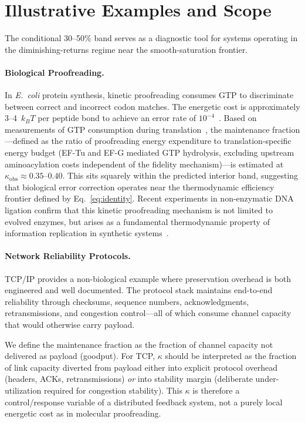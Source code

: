\documentclass[11pt,twocolumn]{article}
\begin{document}
\section{Illustrative Examples and Scope}
\label{sec:validation}

The conditional 30--50\% band serves as a diagnostic tool for systems operating in the diminishing-returns regime near the smooth-saturation frontier.

\paragraph{Biological Proofreading.} In \textit{E.~coli} protein synthesis, kinetic proofreading consumes GTP to discriminate between correct and incorrect codon matches. The energetic cost is approximately 3--4~$k_B T$ per peptide bond to achieve an error rate of $10^{-4}$~\cite{Hopfield1974}. Based on measurements of GTP consumption during translation~\cite{Johansson2012,Loveland2017}, the maintenance fraction---defined as the ratio of proofreading energy expenditure to translation-specific energy budget (EF-Tu and EF-G mediated GTP hydrolysis, excluding upstream aminoacylation costs independent of the fidelity mechanism)---is estimated at $\kappa_{\mathrm{obs}} \approx 0.35$--$0.40$. This sits squarely within the predicted interior band, suggesting that biological error correction operates near the thermodynamic efficiency frontier defined by Eq.~\eqref{eq:identity}. Recent experiments in non-enzymatic DNA ligation confirm that this kinetic proofreading mechanism is not limited to evolved enzymes, but arises as a fundamental thermodynamic property of information replication in synthetic systems~\cite{Aoyanagi2025}.

\paragraph{Network Reliability Protocols.}
TCP/IP provides a non-biological example where preservation overhead is both engineered and well documented. The protocol stack maintains end-to-end reliability through checksums, sequence numbers, acknowledgments, retransmissions, and congestion control---all of which consume channel capacity that would otherwise carry payload.

We define the maintenance fraction as the fraction of channel capacity not delivered as payload (goodput). For TCP, $\kappa$ should be interpreted as the fraction of link capacity diverted from payload either into explicit protocol overhead (headers, ACKs, retransmissions) \emph{or} into stability margin (deliberate under-utilization required for congestion stability). This $\kappa$ is therefore a control/response variable of a distributed feedback system, not a purely local energetic cost as in molecular proofreading.
\end{document}
